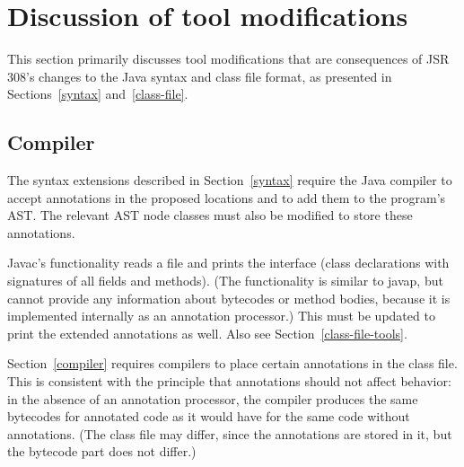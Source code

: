 \documentclass[10pt]{article}
\begin{document}










\section{Discussion of tool modifications\label{mods-discussion}}

This section primarily discusses tool modifications that are consequences
of JSR 308's changes to the Java syntax and class file format, as presented
in Sections~\ref{syntax} and~\ref{class-file}.


\subsection{Compiler\label{compiler-mods}}

The syntax extensions described in Section~\ref{syntax}
require the Java compiler to accept annotations in the proposed
locations and to add them to the program's AST\@.  The relevant AST node
classes must also be modified to store these annotations.


Javac's  functionality reads a  file and prints
the interface (class declarations with signatures of all fields and
methods).  (The  functionality is similar to javap, but
cannot provide
any information about bytecodes or method bodies, because it is implemented
internally as an annotation processor.)
This must be updated to print the extended annotations as well.
Also see Section~\ref{class-file-tools}.


Section~\ref{compiler} requires compilers to place certain annotations
in the class file.  This is consistent with the principle that annotations
should not affect behavior:  in the absence of an annotation processor, the
compiler produces the same bytecodes for annotated code as it would have
for the same code without annotations.  (The class file may differ, since
the annotations are stored in it, but the bytecode part does not differ.)
\end{document}
